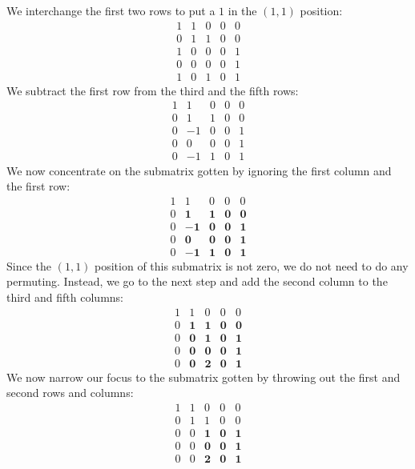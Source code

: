 \documentclass[12pt]{article}
\begin{document}
We interchange the first two rows to put a $1$ in the $(1,1)$ position:
\[
\begin{matrix}
1 & 1 & 0 & 0 & 0 \\
0 & 1 & 1 & 0 & 0 \\
1 & 0 & 0 & 0 & 1 \\
0 & 0 & 0 & 0 & 1 \\
1 & 0 & 1 & 0 & 1
\end{matrix}
\]
We subtract the first row from the third and the fifth rows:
\[
\begin{matrix}
1 & 1 & 0 & 0 & 0 \\
0 & 1 & 1 & 0 & 0 \\
0 & -1 & 0 & 0 & 1 \\
0 & 0 & 0 & 0 & 1 \\
0 & -1 & 1 & 0 & 1
\end{matrix}
\]
We now concentrate on the submatrix gotten by ignoring the 
first column and the first row:
\[
\begin{matrix}
1 & 1 & 0 & 0 & 0 \\
0 & \mathbf{1} & \mathbf{1} & \mathbf{0} & \mathbf{0} \\
0 & \mathbf{-1} & \mathbf{0} & \mathbf{0} & \mathbf{1} \\
0 & \mathbf{0} & \mathbf{0} & \mathbf{0} & \mathbf{1} \\
0 & \mathbf{-1} & \mathbf{1} & \mathbf{0} & \mathbf{1}
\end{matrix}
\]
Since the $(1,1)$ position of this submatrix is not zero,
we do not need to do any permuting.  Instead, we go to the
next step and add the second column to the third and fifth 
columns:
\[
\begin{matrix}
1 & 1 & 0 & 0 & 0 \\
0 & \mathbf{1} & \mathbf{1} & \mathbf{0} & \mathbf{0} \\
0 & \mathbf{0} & \mathbf{1} & \mathbf{0} & \mathbf{1} \\
0 & \mathbf{0} & \mathbf{0} & \mathbf{0} & \mathbf{1} \\
0 & \mathbf{0} & \mathbf{2} & \mathbf{0} & \mathbf{1}
\end{matrix}
\]
We now narrow our focus to the submatrix gotten by throwing
out the first and second rows and columns:
\[
\begin{matrix}
1 & 1 & 0 & 0 & 0 \\
0 & 1 & 1 & 0 & 0 \\
0 & 0 & \mathbf{1} & \mathbf{0} & \mathbf{1} \\
0 & 0 & \mathbf{0} & \mathbf{0} & \mathbf{1} \\
0 & 0 & \mathbf{2} & \mathbf{0} & \mathbf{1}
\end{matrix}
\]
\end{document}
